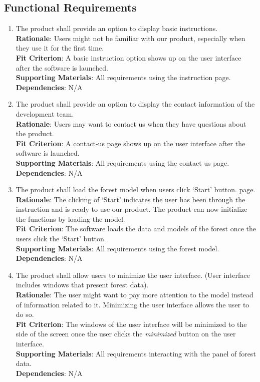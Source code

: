 \documentclass{article}
\begin{document}
\subsection{Functional Requirements}

\begin{enumerate}[FR1]
\item The product shall provide an option to display basic
instructions.\\
\textbf{Rationale}: Users might not be familiar with our
product, especially when they use it for the first time.\\
\textbf{Fit Criterion}: A basic instruction option shows up
on the user interface after the software is launched. \\
\textbf{Supporting Materials}: All requirements using the instruction page.\\
\textbf{Dependencies}: N/A\\

\item The product shall provide an option to display the contact information of
the development team.\\
\textbf{Rationale}: Users may want to contact us when they have questions about the product.\\
\textbf{Fit Criterion}: A contact-us page shows up
on the user interface after the software is launched. \\
\textbf{Supporting Materials}: All requirements using the contact us page.\\
\textbf{Dependencies}: N/A\\
	
\item The product shall load the forest model when users click
`Start' button.
page.\\
\textbf{Rationale}: The clicking of `Start' indicates the user has 
been through the instruction and is ready to use
our product. The product can now initialize the functions
by loading the model.\\
\textbf{Fit Criterion}: The software loads the data and 
models of the forest once the users click the `Start' 
button.\\
\textbf{Supporting Materials}: All requirements using the forest 
model.\\
\textbf{Dependencies}: N/A\\


\item The product shall allow users to minimize the user
interface. (User interface includes windows that present
forest data). \\
\textbf{Rationale}: The user might want to pay more 
attention to the model instead of information related to
it. Minimizing the user interface allows the user to do so. \\
\textbf{Fit Criterion}: The windows of the user interface
will be minimized to the side of the screen once the user
clicks the \textit{minimized} button on the user interface.\\
\textbf{Supporting Materials}: All requirements interacting with the panel of forest data.\\
\textbf{Dependencies}: N/A\\


\end{enumerate}
\end{document}

